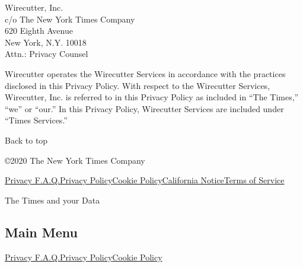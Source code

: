 Wirecutter, Inc.\\
c/o The New York Times Company\\
620 Eighth Avenue\\
New York, N.Y. 10018\\
Attn.: Privacy Counsel

Wirecutter operates the Wirecutter Services in accordance with the
practices disclosed in this Privacy Policy. With respect to the
Wirecutter Services, Wirecutter, Inc. is referred to in this Privacy
Policy as included in ``The Times,'' ``we'' or ``our.'' In this Privacy
Policy, Wirecutter Services are included under ``Times Services.''

Back to top

©2020 The New York Times Company

\href{/privacy}{Privacy F.A.Q.}\href{/privacy/privacy-policy}{Privacy
Policy}\href{/privacy/cookie-policy}{Cookie
Policy}\href{/privacy/california-notice}{California
Notice}\href{https://help.nytimes3xbfgragh.onion/hc/en-us/articles/115014893428-Terms-of-service}{Terms
of Service}

The Times and your Data

\hypertarget{main-menu}{%
\subsection{Main Menu}\label{main-menu}}

\href{/privacy}{Privacy F.A.Q.}\href{/privacy/privacy-policy}{Privacy
Policy}\href{/privacy/cookie-policy}{Cookie Policy}
